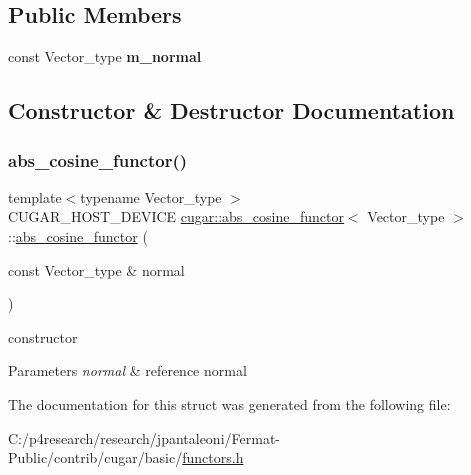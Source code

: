 \subsection*{Public Members}
\begin{DoxyCompactItemize}
\item 
\mbox{\label{structcugar_1_1abs__cosine__functor_ac206121e38972ee4b6f8298cf3141c47}} 
const Vector\+\_\+type {\bfseries m\+\_\+normal}
\end{DoxyCompactItemize}


\subsection{Constructor \& Destructor Documentation}
\mbox{\label{structcugar_1_1abs__cosine__functor_ab1d60f9df4d49c5b5007614a6526e68e}} 
\subsubsection{\texorpdfstring{abs\+\_\+cosine\+\_\+functor()}{abs\_cosine\_functor()}}
{\footnotesize\ttfamily template$<$typename Vector\+\_\+type $>$ \\
C\+U\+G\+A\+R\+\_\+\+H\+O\+S\+T\+\_\+\+D\+E\+V\+I\+CE \hyperlink{structcugar_1_1abs__cosine__functor}{cugar\+::abs\+\_\+cosine\+\_\+functor}$<$ Vector\+\_\+type $>$\+::\hyperlink{structcugar_1_1abs__cosine__functor}{abs\+\_\+cosine\+\_\+functor} (\begin{DoxyParamCaption}\item[{const Vector\+\_\+type \&}]{normal }\end{DoxyParamCaption})\hspace{0.3cm}{\ttfamily [inline]}}

constructor


\begin{DoxyParams}{Parameters}
{\em normal} & reference normal \\
\hline
\end{DoxyParams}


The documentation for this struct was generated from the following file\+:\begin{DoxyCompactItemize}
\item 
C\+:/p4research/research/jpantaleoni/\+Fermat-\/\+Public/contrib/cugar/basic/\hyperlink{functors_8h}{functors.\+h}\end{DoxyCompactItemize}
